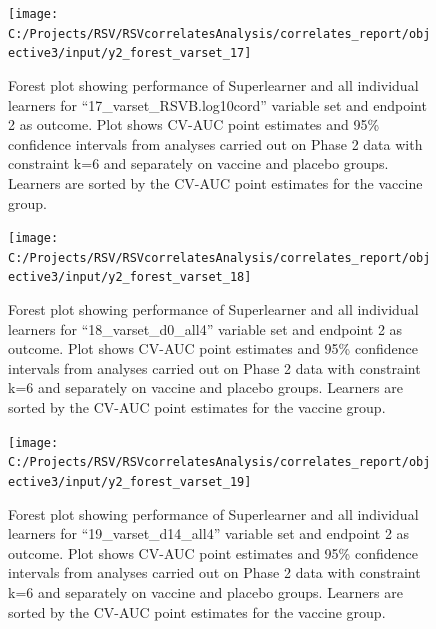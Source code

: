 \documentclass[11pt]{article}
\begin{document}
\begin{figure}[H]

{\centering \texttt{[image: C:/Projects/RSV/RSVcorrelatesAnalysis/correlates\_report/objective3/input/y2\_forest\_varset\_17]} 

}

\caption[Forest plot for ``17\_varset\_RSVB.log10cord'' variable set, endpoint 2.]{Forest plot showing performance of Superlearner and all individual learners for ``17\_varset\_RSVB.log10cord'' variable set and endpoint 2 as outcome. Plot shows CV-AUC point estimates and 95\% confidence intervals from analyses carried out on Phase 2 data with constraint k=6 and separately on vaccine and placebo groups. Learners are sorted by the CV-AUC point estimates for the vaccine group.}\label{fig:y2-forest-varset-17}
\end{figure}

\begin{figure}[H]

{\centering \texttt{[image: C:/Projects/RSV/RSVcorrelatesAnalysis/correlates\_report/objective3/input/y2\_forest\_varset\_18]} 

}

\caption[Forest plot for ``18\_varset\_d0\_all4'' variable set, endpoint 2.]{Forest plot showing performance of Superlearner and all individual learners for ``18\_varset\_d0\_all4'' variable set and endpoint 2 as outcome. Plot shows CV-AUC point estimates and 95\% confidence intervals from analyses carried out on Phase 2 data with constraint k=6 and separately on vaccine and placebo groups. Learners are sorted by the CV-AUC point estimates for the vaccine group.}\label{fig:y2-forest-varset-18}
\end{figure}

\begin{figure}[H]

{\centering \texttt{[image: C:/Projects/RSV/RSVcorrelatesAnalysis/correlates\_report/objective3/input/y2\_forest\_varset\_19]} 

}

\caption[Forest plot for ``19\_varset\_d14\_all4'' variable set, endpoint 2.]{Forest plot showing performance of Superlearner and all individual learners for ``19\_varset\_d14\_all4'' variable set and endpoint 2 as outcome. Plot shows CV-AUC point estimates and 95\% confidence intervals from analyses carried out on Phase 2 data with constraint k=6 and separately on vaccine and placebo groups. Learners are sorted by the CV-AUC point estimates for the vaccine group.}\label{fig:y2-forest-varset-19}
\end{figure}
\end{document}
